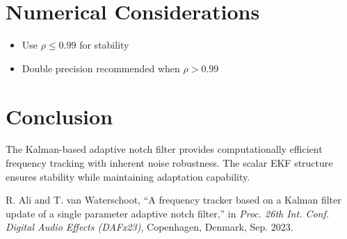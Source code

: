 \documentclass{article}
\begin{document}
\section{Numerical Considerations}
\begin{itemize}
\item Use $\rho \leq 0.99$ for stability
\item Double precision recommended when $\rho > 0.99$
\end{itemize}

\section{Conclusion}
The Kalman-based adaptive notch filter provides computationally efficient frequency tracking with inherent noise robustness. The scalar EKF structure ensures stability while maintaining adaptation capability.

\begin{thebibliography}{9}
R. Ali and T. van Waterschoot, 
``A frequency tracker based on a Kalman filter update of a single parameter adaptive notch filter,'' 
in \emph{Proc. 26th Int. Conf. Digital Audio Effects (DAFx23)}, 
Copenhagen, Denmark, Sep. 2023.
\end{thebibliography}
\end{document}
